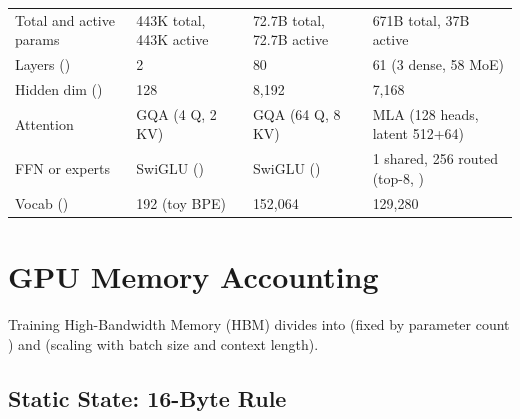 \par\vspace{4pt}\noindent\begin{minipage}{\linewidth}
\small
\begin{tabularx}{\linewidth}{@{}l Y Y Y@{}}
\toprule
{} &  &  &  \\
\midrule
Total and active params & 443K total, 443K active & 72.7B total, 72.7B active & 671B total, 37B active \\
Layers () & 2 & 80 & 61 (3 dense, 58 MoE) \\
Hidden dim () & 128 & 8,192 & 7,168 \\
Attention & GQA (4 Q, 2 KV) & GQA (64 Q, 8 KV) & MLA (128 heads, latent 512+64) \\
FFN or experts & SwiGLU () & SwiGLU () & 1 shared, 256 routed (top-8, ) \\
Vocab () & 192 (toy BPE) & 152,064 & 129,280 \\
\bottomrule
\end{tabularx}
\end{minipage}\par\vspace{4pt}

\section{GPU Memory Accounting}

Training High-Bandwidth Memory (HBM) divides into  (fixed by parameter count ) and  (scaling with batch size and context length).

\subsection{Static State: 16-Byte Rule}

